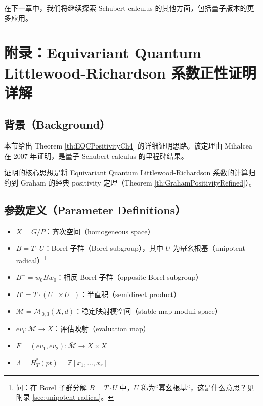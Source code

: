 在下一章中，我们将继续探索 Schubert calculus 的其他方面，包括量子版本的更多应用。


\section{附录：Equivariant Quantum Littlewood-Richardson 系数正性证明详解}
\label{sec:appendix-eqc-proof}

\subsection{背景（Background）}

本节给出 Theorem \cref{th:EQCPositivityCh4} 的详细证明思路。该定理由 Mihalcea 在 2007 年证明，是量子 Schubert calculus 的里程碑结果。

证明的核心思想是将 Equivariant Quantum Littlewood-Richardson 系数的计算归约到 Graham 的经典 positivity 定理（Theorem \cref{th:GrahamPositivityRefined}）。

\subsection{参数定义（Parameter Definitions）}
\begin{itemize}
\item $X = G/P$：齐次空间（homogeneous space）
\item $B = T \cdot U$：Borel 子群（Borel subgroup），其中 $U$ 为幂幺根基（unipotent radical）\footnote{问：在 Borel 子群分解 $B = T \cdot U$ 中，$U$ 称为``幂幺根基``，这是什么意思？见附录 \cref{sec:unipotent-radical}。}
\item $B^- = w_0 B w_0$：相反 Borel 子群（opposite Borel subgroup）
\item $B' = T \cdot (U^- \times U^-)$：半直积（semidirect product）
\item $\overline{\mathcal{M}} = \overline{\mathcal{M}}_{0,3}(X,d)$：稳定映射模空间（stable map moduli space）
\item $ev_i : \overline{\mathcal{M}} \to X$：评估映射（evaluation map）
\item $F = (ev_1, ev_2) : \overline{\mathcal{M}} \to X \times X$
\item $\Lambda = H_T^*(pt) = \mathbb{Z}[x_1, \ldots, x_r]$
\end{itemize}


